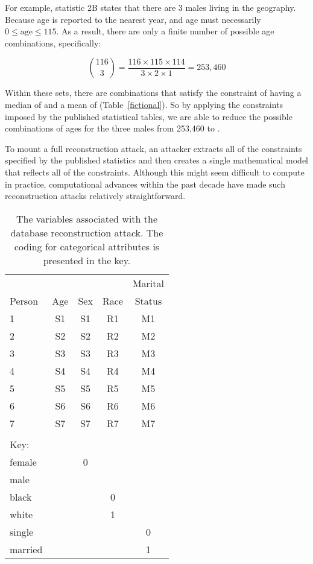 \documentclass[runningheads]{llncs}
\begin{document}
For example, statistic 2B states that there are 3 males living in the
geography.  Because age is reported to the nearest year, and
age must necessarily $0 \le \textrm{age} \le 115$. As a result, there
are only a finite number of possible age combinations, specifically:

\[ \binom{116}{3}=\frac{116 \times 115 \times 114}{3 \times 2 \times
  1} = 253,460 \]


Within these sets, there are \mycount{} combinations that satisfy the
constraint of having a median of \mymedian{} and a mean of \mymean{}
(Table~\ref{fictional}). So by applying the constraints imposed by the
published statistical tables, we are able to reduce the possible
combinations of ages for the three males from 253,460 to \mycount.

To mount a full reconstruction attack, an attacker extracts all of the
constraints specified by the published statistics and then creates a
single mathematical model that reflects all of the
constraints.  
Although this might seem difficult to compute in practice,
computational advances within the past decade have made such
reconstruction attacks relatively straightforward.


\begin{center}
\begin{table}
\begin{tabular}{l|cccc}
       &     &     &      & Marital  \\
Person & Age & Sex & Race & Status   \\
\hline                             
1      & S1  & S1  & R1   & M1       \\
2      & S2  & S2  & R2   & M2       \\
3      & S3  & S3  & R3   & M3       \\
4      & S4  & S4  & R4   & M4       \\
5      & S5  & S5  & R5   & M5       \\
6      & S6  & S6  & R6   & M6       \\
7      & S7  & S7  & R7   & M7       \\
\hline
\\
\multicolumn{1}{l}{Key:}\\
\hline
female &     &  0  & \\
male   &     &     & \\
\hline
black  &     &     &  0   & \\
white  &     &     &  1   & \\
\hline
single &     &     &      &   0\\
married&     &     &      &   1\\
\hline
\end{tabular}
\caption{The variables associated with the database reconstruction
  attack. The coding for categorical attributes is presented in the key.}\label{variables}
\end{table}

\end{center}
\end{document}
